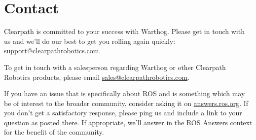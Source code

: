 \documentclass[]{clearpath-latex/clearpath-manual}
\begin{document}
\section{Contact}
\label{contact}

Clearpath is committed to your success with Warthog. Please get in touch with us and we’ll do our best to get
you rolling again quickly: \url{support@clearpathrobotics.com}.

To get in touch with a salesperson regarding Warthog or other Clearpath Robotics products, please email
\url{sales@clearpathrobotics.com}.

If you have an issue that is specifically about ROS and is something which may be of interest to the broader
community, consider asking it on \url{answers.ros.org}. If you don’t get a satisfactory response, please ping us and
include a link to your question as posted there. If appropriate, we’ll answer in the ROS Answers context for
the benefit of the community.
\end{document}
